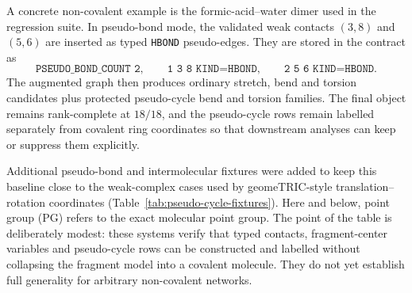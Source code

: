 \documentclass[journal=jctcce,manuscript=article,layout=traditional]{achemso}
\theoremstyle{definition}
\begin{document}
A concrete non-covalent example is the formic-acid--water dimer used in the
regression suite.  In pseudo-bond mode, the validated weak contacts
\((3,8)\) and \((5,6)\) are inserted as typed \texttt{HBOND} pseudo-edges.
They are stored in the contract as
\[
  \texttt{PSEUDO\_BOND\_COUNT 2}, \qquad
  \texttt{1 3 8 KIND=HBOND}, \qquad
  \texttt{2 5 6 KIND=HBOND}.
\]
The augmented graph then produces ordinary stretch, bend and torsion candidates
plus protected pseudo-cycle bend and torsion families.  The final object
remains rank-complete at \(18/18\), and the pseudo-cycle rows remain labelled
separately from covalent ring coordinates so that downstream analyses can keep
or suppress them explicitly.

Additional pseudo-bond and intermolecular fixtures were added to keep this
baseline close to the weak-complex cases used by geomeTRIC-style
translation--rotation coordinates (Table~\ref{tab:pseudo-cycle-fixtures}).
Here and below, point group (PG) refers to the exact molecular point group.
The point of the table is deliberately modest: these systems verify that typed
contacts, fragment-center variables and pseudo-cycle rows can be constructed
and labelled without collapsing the fragment model into a covalent molecule.
They do not yet establish full generality for arbitrary non-covalent networks.
\end{document}

